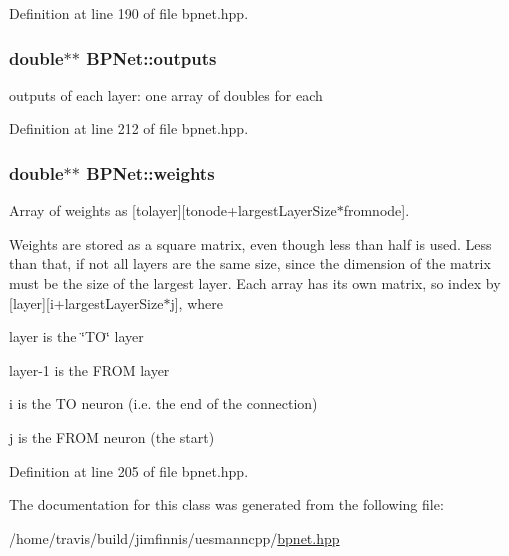 Definition at line 190 of file bpnet.\+hpp.

\subsubsection[{\texorpdfstring{outputs}{outputs}}]{\setlength{\rightskip}{0pt plus 5cm}double$\ast$$\ast$ B\+P\+Net\+::outputs\hspace{0.3cm}{\ttfamily [protected]}}\hypertarget{classBPNet_af2839f081e9f715b207fcc89789bfd0a}{}\label{classBPNet_af2839f081e9f715b207fcc89789bfd0a}


outputs of each layer\+: one array of doubles for each 



Definition at line 212 of file bpnet.\+hpp.

\subsubsection[{\texorpdfstring{weights}{weights}}]{\setlength{\rightskip}{0pt plus 5cm}double$\ast$$\ast$ B\+P\+Net\+::weights\hspace{0.3cm}{\ttfamily [protected]}}\hypertarget{classBPNet_aca57e8583a315a709a27e4dffeefd493}{}\label{classBPNet_aca57e8583a315a709a27e4dffeefd493}


Array of weights as \mbox{[}tolayer\mbox{]}\mbox{[}tonode+largest\+Layer\+Size$\ast$fromnode\mbox{]}. 

Weights are stored as a square matrix, even though less than half is used. Less than that, if not all layers are the same size, since the dimension of the matrix must be the size of the largest layer. Each array has its own matrix, so index by \mbox{[}layer\mbox{]}\mbox{[}i+largest\+Layer\+Size$\ast$j\mbox{]}, where
\begin{DoxyItemize}
\item layer is the \char`\"{}\+T\+O\char`\"{} layer
\item layer-\/1 is the F\+R\+OM layer
\item i is the TO neuron (i.\+e. the end of the connection)
\item j is the F\+R\+OM neuron (the start) 
\end{DoxyItemize}

Definition at line 205 of file bpnet.\+hpp.



The documentation for this class was generated from the following file\+:\begin{DoxyCompactItemize}
\item 
/home/travis/build/jimfinnis/uesmanncpp/\hyperlink{bpnet_8hpp}{bpnet.\+hpp}\end{DoxyCompactItemize}
